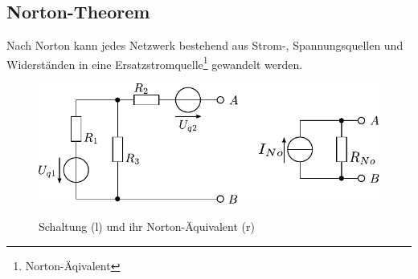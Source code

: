\subsection{Norton-Theorem}
Nach Norton kann jedes Netzwerk bestehend aus Strom-, Spannungsquellen und Widerständen in eine Ersatzstromquelle\footnote{Norton-Äqivalent} gewandelt werden.

\begin{figure}[h!]
\centering
\includegraphics[scale=\schscale]{norton_sch_2.pdf}
\label{sch:norton}
\caption{Schaltung (l) und ihr Norton-Äquivalent (r)}
\end{figure}
